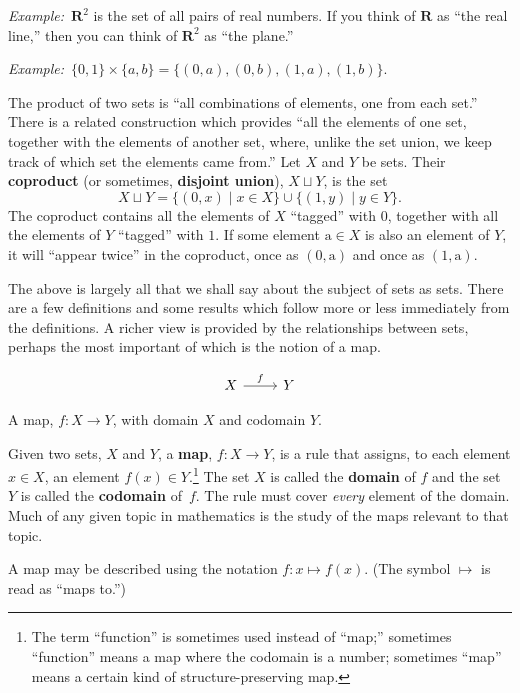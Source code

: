 \documentclass[12pt, a4paper]{article}
\newcommand{\defn}[1]{\textbf{#1}}
\newcommand{\set}[1]{\mathbold{#1}}
\newcommand{\eg}{\emph{Example:}\relax}
\begin{document}
\eg\ $\set{R}^2$ is the set of all pairs of real numbers. If you think
of $\set{R}$ as ``the real line,'' then you can think of $\set{R}^2$
as ``the plane.''

\eg\ $\{0,1\}\times\{a, b\} = \{(0,a), (0,b), (1,a), (1,b)\}$. 

The product of two sets is “all combinations of elements, one from
each set.” There is a related construction which provides “all the
elements of one set, together with the elements of another set, where,
unlike the set union, we keep track of which set the elements came
from.” Let $X$ and $Y$ be sets. Their \defn{coproduct} (or sometimes,
\defn{disjoint union}), $X \sqcup Y$, is the set
\begin{equation*}
  X \sqcup Y = \{(0,x) \mid x\in X\} \cup \{(1, y)\mid y\in Y\}.
\end{equation*}
The coproduct contains all the elements of $X$ “tagged” with $0$,
together with all the elements of $Y$ “tagged” with $1$. If some
element $\text{a}\in X$ is also an element of $Y$, it will “appear twice” in the
coproduct, once as $(0,\text{a})$ and once as $(1,\text{a})$. 

The above is largely all that we shall say about the subject of sets
as sets. There are a few definitions and some results which follow
more or less immediately from the definitions. A richer view is
provided by the relationships between sets, perhaps the most important
of which is the notion of a map.

\begin{sidefigure}
  \[\begin{tikzcd}
    X \arrow[r, "f"] & Y
  \end{tikzcd}\]
  \caption{A map, $f\colon X\to Y$, with domain $X$ and codomain $Y$.}
\end{sidefigure}
Given two sets, $X$ and $Y$, a \defn{map}, $f\colon X \to Y$, is a rule
that assigns, to each element $x \in X$, an element $f(x) \in
Y$.\footnote{The term “function” is sometimes used instead of “map;”
sometimes “function” means a map where the codomain is a number;
sometimes “map” means a certain kind of structure-preserving map.} The
set $X$ is called the \defn{domain} of $f$ and the set $Y$ is called
the \defn{codomain} of~$f$. The rule must cover \emph{every} element
of the domain. Much of any given topic in mathematics is the study of
the maps relevant to that topic.

A map may be described using the notation $f\colon x\mapsto f(x)$. (The
symbol $\mapsto$ is read as ``maps to.'')
\end{document}
